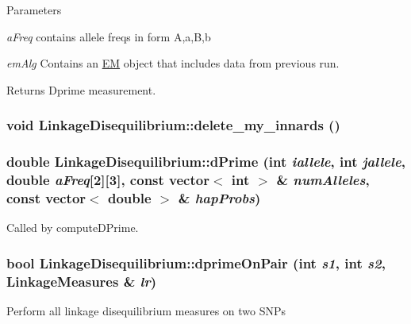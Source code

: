 \begin{DoxyParams}{Parameters}
\item[{\em aFreq}]contains allele freqs in form A,a,B,b \item[{\em emAlg}]Contains an \hyperlink{classEM}{EM} object that includes data from previous run. \end{DoxyParams}
\begin{DoxyReturn}{Returns}
Dprime measurement. 
\end{DoxyReturn}
\hypertarget{classLinkageDisequilibrium_aae443ca228a7ae15b3611c1c6d8429ad}{
\subsubsection[{delete\_\-my\_\-innards}]{\setlength{\rightskip}{0pt plus 5cm}void LinkageDisequilibrium::delete\_\-my\_\-innards ()}}
\label{classLinkageDisequilibrium_aae443ca228a7ae15b3611c1c6d8429ad}
\hypertarget{classLinkageDisequilibrium_a24f37b16583031e1b335109fe0755a24}{
\subsubsection[{dPrime}]{\setlength{\rightskip}{0pt plus 5cm}double LinkageDisequilibrium::dPrime (int {\em iallele}, \/  int {\em jallele}, \/  double {\em aFreq}\mbox{[}2\mbox{]}\mbox{[}3\mbox{]}, \/  const vector$<$ int $>$ \& {\em numAlleles}, \/  const vector$<$ double $>$ \& {\em hapProbs})}}
\label{classLinkageDisequilibrium_a24f37b16583031e1b335109fe0755a24}
Called by computeDPrime. \hypertarget{classLinkageDisequilibrium_a11db054a2925bd82379a6b39a9f3464f}{
\subsubsection[{dprimeOnPair}]{\setlength{\rightskip}{0pt plus 5cm}bool LinkageDisequilibrium::dprimeOnPair (int {\em s1}, \/  int {\em s2}, \/  {\bf LinkageMeasures} \& {\em lr})}}
\label{classLinkageDisequilibrium_a11db054a2925bd82379a6b39a9f3464f}
Perform all linkage disequilibrium measures on two SNPs


